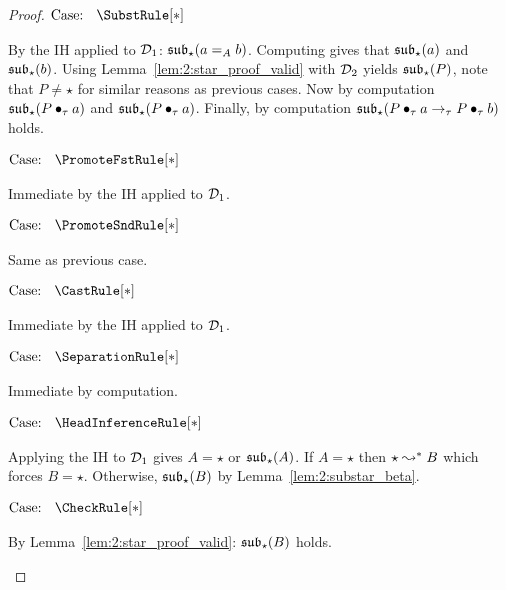 \begin{proof}
    $\text{Case: }\begin{array}{c} \SubstRule[*] \end{array}$
    \begin{proofcase}
        By the IH applied to $\mathcal{D}_{1}$: $\mathfrak{sub}_\star(a =_A b)$.
        Computing gives that $\mathfrak{sub}_\star(a)$ and $\mathfrak{sub}_\star(b)$.
        Using Lemma~\ref{lem:2:star_proof_valid} with $\mathcal{D}_{2}$ yields $\mathfrak{sub}_\star(P)$, note that $P \neq \star$ for similar reasons as previous cases.
        Now by computation $\mathfrak{sub}_\star(P \bullet_{\tau} a)$ and $\mathfrak{sub}_\star(P \bullet_{\tau} a)$.
        Finally, by computation $\mathfrak{sub}_\star(P \bullet_{\tau} a \to_\tau P \bullet_{\tau} b)$ holds.
    \end{proofcase}

    $\text{Case: }\begin{array}{c} \PromoteFstRule[*] \end{array}$
    \begin{proofcase}
        Immediate by the IH applied to $\mathcal{D}_{1}$.
    \end{proofcase}

    $\text{Case: }\begin{array}{c} \PromoteSndRule[*] \end{array}$
    \begin{proofcase}
        Same as previous case.
    \end{proofcase}

    $\text{Case: }\begin{array}{c} \CastRule[*] \end{array}$
    \begin{proofcase}
        Immediate by the IH applied to $\mathcal{D}_{1}$.
    \end{proofcase}

    $\text{Case: }\begin{array}{c} \SeparationRule[*] \end{array}$
    \begin{proofcase}
        Immediate by computation.
    \end{proofcase}

    $\text{Case: }\begin{array}{c} \HeadInferenceRule[*] \end{array}$
    \begin{proofcase}
        Applying the IH to $\mathcal{D}_{1}$ gives $A = \star$ or $\mathfrak{sub}_\star(A)$.
        If $A = \star$ then $\star \leadsto^* B$ which forces $B = \star$.
        Otherwise, $\mathfrak{sub}_\star(B)$ by Lemma~\ref{lem:2:substar_beta}.
    \end{proofcase}

    $\text{Case: }\begin{array}{c} \CheckRule[*] \end{array}$
    \begin{proofcase}
        By Lemma~\ref{lem:2:star_proof_valid}: $\mathfrak{sub}_\star(B)$ holds.
    \end{proofcase}
\end{proof}

